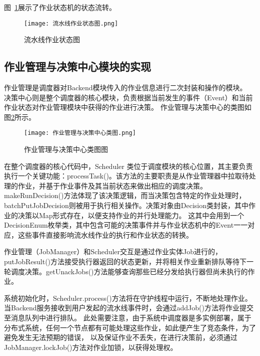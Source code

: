 图~\ref{fig:流水线作业状态图}展示了作业状态机的状态流转。

\begin{figure}[h]
  \centering
  \texttt{[image: 流水线作业状态图.png]}
  \caption{流水线作业状态图}
  \label{fig:流水线作业状态图}
\end{figure}



\subsection{作业管理与决策中心模块的实现}

作业管理是调度器对Backend模块传入的作业信息进行二次封装和操作的模块。
决策中心则是整个调度器的核心模块，负责根据当前发生的事件（Event）和当前作业状态对作业管理模块中获得的作业进行决策。
作业管理与决策中心的类图如图\ref{fig:作业管理与决策中心类图}所示。

\begin{figure}[h]
  \centering
  \texttt{[image: 作业管理与决策中心类图.png]}
  \caption{作业管理与决策中心类图图}
  \label{fig:作业管理与决策中心类图}
\end{figure}

在整个调度器的核心代码中，Scheduler 类位于调度模块的核心位置，其主要负责执行一个关键功能：processTask()。该方法的主要职责是从作业管理器中拉取待处理的作业，并基于作业事件及其当前状态来做出相应的调度决策。
makeRunDecision()方法体现了该决策逻辑，而当决策包含特定的作业处理时，batchPutJobDecision则被用于执行相关操作。决策对象由Decision类封装，其中作业的决策以Map形式存在，以便支持作业的并行处理能力。
这其中会用到一个DecisionEnum枚举类，其中包含可能的决策事件并与作业状态机中的Event一一对应，这些事件直接影响流水线作业的执行和作业状态的转换。

作业管理（JobManager）和Scheduler交互是通过作业实体Job进行的，putJobResult()方法接受执行器返回的状态更新，并将相关作业重新排队等待下一轮调度决策。getUnackJobs()方法能够查询那些已经分发给执行器但尚未执行的作业。

系统初始化时，Scheduler.process()方法将在守护线程中运行，不断地处理作业。当Backend服务接收到用户发起的流水线事件时，会通过addJob()方法将作业提交至消息队列中进行排队。
此处需要注意，由于系统中调度器是多实例部署，属于分布式系统，任何一个节点都有可能处理这些作业，如此便产生了竞态条件，为了避免发生无法预期的错误，
以及保证作业不丢失，在进行决策前，必须通过JobManager.lockJob()方法对作业加锁，以获得处理权。

